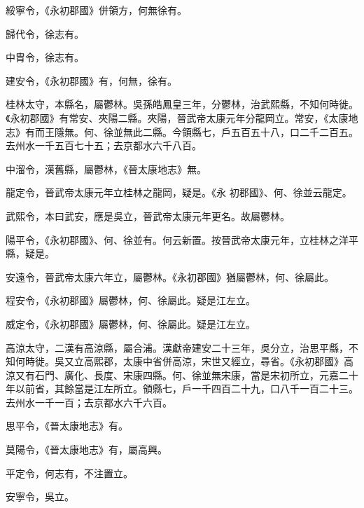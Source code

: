 \begin{pinyinscope}
 綏寧令，《永初郡國》併領方，何無徐有。



 歸代令，徐志有。



 中胄令，徐志有。



 建安令，《永初郡國》有，何無，徐有。



 桂林太守，本縣名，屬鬱林。吳孫皓鳳皇三年，分鬱林，治武熙縣，不知何時徙。《永初郡國》有常安、夾陽二縣。夾陽，晉武帝太康元年分龍岡立。常安，《太康地志》有而王隱無。何、徐並無此二縣。今領縣七，戶五百五十八，口二千二百五。去州水一千五百七十五；去京都水六千八百。



 中溜令，漢舊縣，屬鬱林，《晉太康地志》無。



 龍定令，晉武帝太康元年立桂林之龍岡，疑是。《永
 初郡國》、何、徐並云龍定。



 武熙令，本曰武安，應是吳立，晉武帝太康元年更名。故屬鬱林。



 陽平令，《永初郡國》、何、徐並有。何云新置。按晉武帝太康元年，立桂林之洋平縣，疑是。



 安遠令，晉武帝太康六年立，屬鬱林。《永初郡國》猶屬鬱林，何、徐屬此。



 程安令，《永初郡國》屬鬱林，何、徐屬此。疑是江左立。



 威定令，《永初郡國》屬鬱林，何、徐屬此。疑是江左立。



 高涼太守，二漢有高涼縣，屬合浦。漢獻帝建安二十三年，吳分立，治思平縣，不知何時徙。吳又立高熙郡，太康中省併高涼，宋世又經立，尋省。《永初郡國》高涼又有石門、廣化、長度、宋康四縣。何、徐並無宋康，當是宋初所立，元嘉二十年以前省，其餘當是江左所立。領縣七，戶一千四百二十九，口八千一百二十三。去州水一千一百；去京都水六千六百。



 思平令，《晉太康地志》有。



 莫陽令，《晉太康地志》有，屬高興。



 平定令，何志有，不注置立。



 安寧令，吳立。




\end{pinyinscope}
